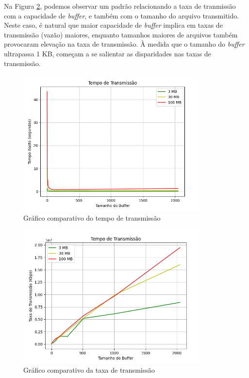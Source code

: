 \documentclass[a4paper, 12pt]{article}
\begin{document}
Na Figura \ref{fig:exampleFig2}, podemos observar um padrão relacionando a taxa de tranmissão com a capacidade de \emph{buffer}, e também com o tamanho do arquivo transmitido. Neste caso, é natural que maior capacidade de \emph{buffer} implica em taxas de transmissão (vazão) maiores, enquanto tamanhos maiores de arquivos também provocaram elevação na taxa de transmissão. À medida que o tamanho do \emph{buffer} ultrapassa 1 KB, começam a se salientar as disparidades nas taxas de transmissão.

\begin{figure}[H]
    \centering
    \includegraphics[width=0.85\textwidth]{Images/time.png}
    \caption{Gráfico comparativo do tempo de transmissão}
    \label{fig:exampleFig1}
\end{figure}
\begin{figure}[H]
    \centering
    \includegraphics[width=0.85\textwidth]{Images/rate.png}
    \caption{Gráfico comparativo da taxa de transmissão}
    \label{fig:exampleFig2}
\end{figure}
\end{document}
